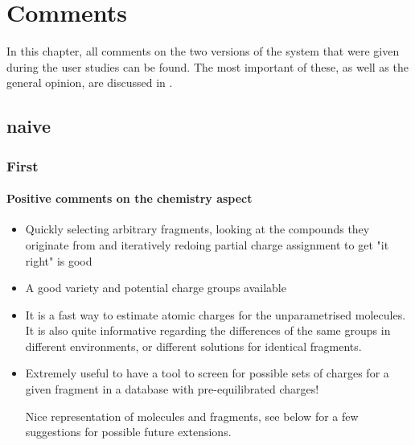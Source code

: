 \chapter{Comments}

In this chapter, all comments on the two versions of the system that were given during the user studies can be found. The most important of these, as well as the general opinion, are discussed in .

\section{\oframp{} naive}
\subsection{First}
\subsubsection{Positive comments on the chemistry aspect}
\begin{itemize}
\item Quickly selecting arbitrary fragments, looking at the compounds they originate from and iteratively redoing partial charge assignment to get "it right" is good

\item A good variety and potential charge groups available

\item It is a fast way to estimate atomic charges for the unparametrised molecules. It is also quite informative regarding the differences of the same groups in different environments, or different solutions for identical fragments.

\item Extremely useful to have a tool to screen for possible sets of charges for a given fragment in a database with pre-equilibrated charges!

Nice representation of molecules and fragments, see below for a few suggestions for possible future extensions.

\end{itemize}


